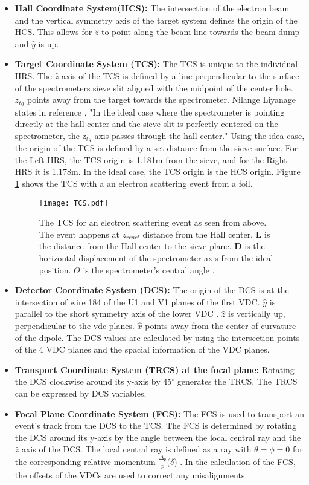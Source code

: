 \begin{itemize}
	\item \textbf{Hall Coordinate System(HCS):} The intersection of the electron beam and the vertical symmetry axis of the target system defines the origin of the HCS. This allows for $\hat{z}$ to point along the beam line towards the beam dump and $\hat{y}$ is up. 
	\item \textbf{Target Coordinate System (TCS):} The TCS is unique to the individual HRS. The $\hat{z}$ axis of the TCS is defined by a line perpendicular to the surface of the spectrometers sieve slit aligned with the midpoint of the center hole. $z_{tg}$ points away from the target towards the spectrometer. Nilange Liyanage states in reference \cite{optics}, "In the ideal case where the spectrometer is pointing directly at the hall center and the sieve slit is perfectly centered on the spectrometer, the z$_{tg}$ axis passes through the hall center." Using the idea case, the origin of the TCS is defined by a set distance from the sieve surface. For the Left HRS, the TCS origin is 1.181m from the sieve, and for the Right HRS it is 1.178m. In the ideal case, the TCS origin is the HCS origin. Figure \ref{fig:TCS} shows the TCS with a an electron scattering event from a foil.  
	\begin{figure}[]
		\centering
		\texttt{[image: TCS.pdf]}
		\caption{The TCS for an electron scattering event as seen from above. The event happens at $z_{react}$ distance from the Hall center. \textbf{L} is the distance from the Hall center to the sieve plane. \textbf{D} is the horizontal displacement of the spectrometer axis from the ideal position. $\Theta$ is the spectrometer's central angle \cite{optics}. }
		\label{fig:TCS}
	\end{figure}
	\item \textbf{Detector Coordinate System (DCS):}  The origin of the DCS is at the intersection of wire 184 of the U1 and V1 planes of the first VDC. $\hat{y}$ is parallel to the short symmetry axis of the lower VDC \cite{espace}. $\hat{z}$ is vertically up, perpendicular to the vdc planes.  $\hat{x}$  points away from the center of curvature of the dipole. The DCS values are calculated by using the intersection points of the 4 VDC planes and the spacial information of the VDC planes.
	\item \textbf{Transport Coordinate System (TRCS) at the focal plane:} Rotating the DCS clockwise around its y-axis by 45$^\circ$ generates the TRCS. The TRCS can be expressed by  DCS variables. 	
	\item \textbf{Focal Plane Coordinate System (FCS):} The FCS is used to transport an event's track from the DCS to the TCS. The FCS is determined by rotating the DCS around its y-axis by the angle between the local central ray and the $\hat{z}$ axis of the DCS. The local central ray is defined as a ray with $\theta = \phi =0$ for the corresponding relative momentum $\frac{\Delta_p}{p}$($\delta$) \cite{optics}. In the calculation of the FCS, the offsets of the VDCs are used to correct any misalignments.  
\end{itemize}
